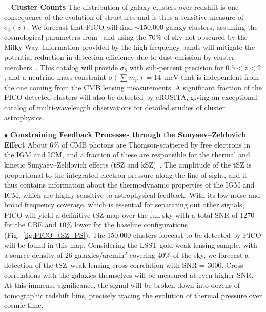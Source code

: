 \documentclass[PICOAPC.tex]{subfiles}
\begin{document}
{\bf -- Cluster Counts} \hspace{0.1in} \label{clusters}  
The distribution of galaxy clusters over redshift is one consequence of the evolution of structures and is thus a sensitive measure of $\sigma_{8}(z)$. We forecast that PICO will find $\sim$150,000 galaxy clusters, assuming the cosmological parameters from \planck\  and using the 70\% of sky not obscured by the Milky Way.  Information provided by the high frequency bands will mitigate the potential reduction in detection efficiency due to dust emission by cluster members~\citep{melin_2018}. This catalog will provide $\sigma_{8}$ with sub-percent precision for $0.5 < z < 2$, and a neutrino mass constraint $\sigma(\sum m_{\nu}) = 14$~meV that is independent from the one coming from the CMB lensing measurements. A significant fraction of the PICO-detected clusters will also be detected by eROSITA, giving an exceptional catalog of multi-wavelength observations for detailed studies of cluster astrophysics. 


$\bullet$ {\bf Constraining Feedback Processes through the Sunyaev--Zeldovich Effect} \hspace{0.1in} \label{sec:sz}
About 6\% of CMB photons are Thomson-scattered by free electrons in the \ac{IGM} and \ac{ICM}, and a fraction of these are responsible for the thermal and kinetic Sunyaev--Zeldovich effects (tSZ and kSZ)~\citep{zeldovich69,SZ1972}. The amplitude of the tSZ is proportional to the integrated electron pressure along the line of sight, and it thus contains information about the thermodynamic properties of the \ac{IGM} and \ac{ICM}, which are highly sensitive to astrophysical feedback. With its low noise and broad frequency coverage, which is essential for separating out other signals, PICO will yield a definitive tSZ map over the full sky with a total \ac{SNR} of 1270 for the CBE and $10$\% lower for the baseline configurations (Fig.~\ref{fig:PICO_tSZ_PS}).   
The 150,000 clusters forecast to be detected by PICO will be found in this map.
Considering the LSST gold weak-lensing sample, with a source density of 26 galaxies/arcmin${}^2$ covering 40\% of the sky, we forecast a detection of the tSZ--weak-lensing cross-correlation with \ac{SNR} = 3000.  Cross-correlations with the galaxies themselves will be measured at even higher \ac{SNR}.  At this immense significance, the signal will be broken down into dozens of tomographic redshift bins, precisely tracing the evolution of thermal pressure over cosmic time.  
\end{document}
